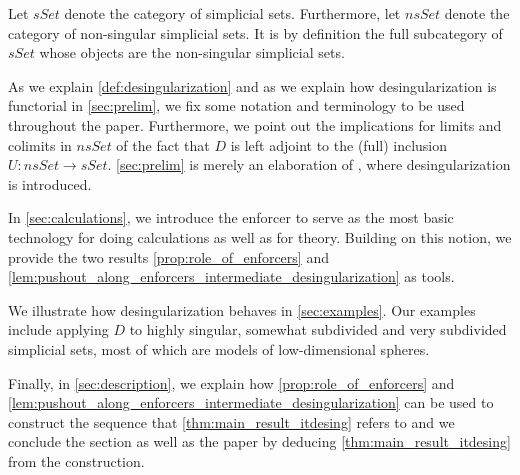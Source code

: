 Let $sSet$ denote the category of simplicial sets. Furthermore, let $nsSet$ denote the category of non-singular simplicial sets. It is by definition the full subcategory of $sSet$ whose objects are the non-singular simplicial sets.

As we explain \cref{def:desingularization} and as we explain how desingularization is functorial in \cref{sec:prelim}, we fix some notation and terminology to be used throughout the paper. Furthermore, we point out the implications for limits and colimits in $nsSet$ of the fact that $D$ is left adjoint to the (full) inclusion $U:nsSet\to sSet$. \cref{sec:prelim} is merely an elaboration of \cite[Rem.~2.2.12]{WJR13}, where desingularization is introduced.

In \cref{sec:calculations}, we introduce the enforcer to serve as the most basic technology for doing calculations as well as for theory. Building on this notion, we provide the two results \cref{prop:role_of_enforcers} and \cref{lem:pushout_along_enforcers_intermediate_desingularization} as tools.

We illustrate how desingularization behaves in \cref{sec:examples}. Our examples include applying $D$ to highly singular, somewhat subdivided and very subdivided simplicial sets, most of which are models of low-dimensional spheres.

Finally, in \cref{sec:description}, we explain how \cref{prop:role_of_enforcers} and \cref{lem:pushout_along_enforcers_intermediate_desingularization} can be used to construct the sequence that \cref{thm:main_result_itdesing} refers to and we conclude the section as well as the paper by deducing \cref{thm:main_result_itdesing} from the construction.


